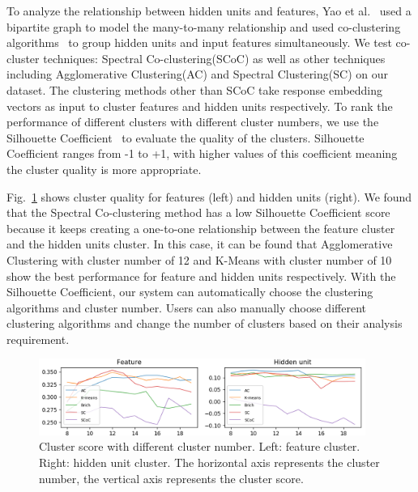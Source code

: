To analyze the relationship between hidden units and features, Yao et al.~\cite{ming2017understanding} used a bipartite graph to model the many-to-many relationship and used co-clustering algorithms~\cite{dhillon2001co} to group hidden units and input features simultaneously. We test co-cluster techniques: Spectral Co-clustering(SCoC) as well as other techniques including Agglomerative Clustering(AC) and Spectral Clustering(SC) on our dataset. The clustering methods other than SCoC take response embedding vectors as input to cluster features and hidden units respectively. To rank the performance of different clusters with different cluster numbers, we use the Silhouette Coefficient~\cite{rousseeuw1987silhouettes} to evaluate the quality of the clusters. Silhouette Coefficient ranges from -1 to +1,  with higher values of this coefficient meaning the cluster quality is more appropriate. 


Fig.~\ref{fig:cluster_parameters} shows cluster quality for features (left) and hidden units (right). We found that the Spectral Co-clustering method has a low Silhouette Coefficient score because it keeps creating a one-to-one relationship between the feature cluster and the hidden units cluster. In this case, it can be found that Agglomerative Clustering with cluster number of 12 and K-Means with cluster number of 10 show the best performance for feature and hidden units respectively.
With the Silhouette Coefficient, our system can automatically choose the clustering algorithms and cluster number.
Users can also manually choose different clustering algorithms and change the number of clusters based on their analysis requirement.



\begin{figure}[t]
	\centering
	\includegraphics[width=0.95\textwidth]{figure/MultiRNNExplorer/methods/cluster_parameters.png}
	\vspace{-3mm}
	\caption{Cluster score with different cluster number. Left: feature cluster. Right: hidden unit cluster. The horizontal axis represents the cluster number, the vertical axis represents the cluster score. 
	}
	\label{fig:cluster_parameters}
	\vspace{-4mm}
\end{figure}

